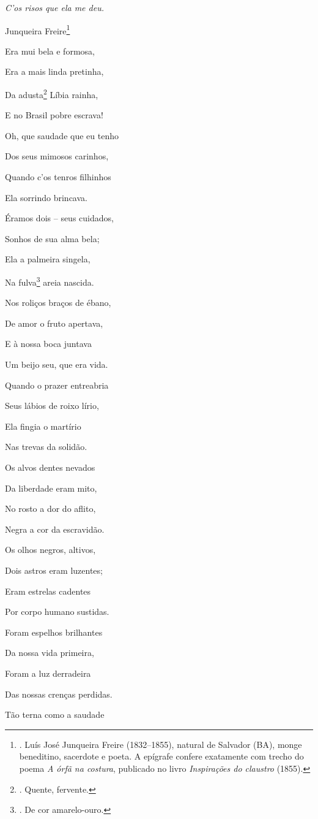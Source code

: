 \emph{C'os risos que ela me deu.}

Junqueira Freire\footnote{. Luís José Junqueira Freire (1832--1855),
  natural de Salvador (BA), monge beneditino, sacerdote e poeta. A
  epígrafe confere exatamente com trecho do poema \emph{A órfã na
  costura}, publicado no livro \emph{Inspirações do claustro} (1855).}

Era mui bela e formosa,

Era a mais linda pretinha,

Da adusta\footnote{. Quente, fervente.} Líbia rainha,

E no Brasil pobre escrava!

Oh, que saudade que eu tenho

Dos seus mimosos carinhos,

Quando c'os tenros filhinhos

Ela sorrindo brincava.

Éramos dois -- seus cuidados,

Sonhos de sua alma bela;

Ela a palmeira singela,

Na fulva\footnote{. De cor amarelo-ouro.} areia nascida.

Nos roliços braços de ébano,

De amor o fruto apertava,

E à nossa boca juntava

Um beijo seu, que era vida.

Quando o prazer entreabria

Seus lábios de roixo lírio,

Ela fingia o martírio

Nas trevas da solidão.

Os alvos dentes nevados

Da liberdade eram mito,

No rosto a dor do aflito,

Negra a cor da escravidão.

Os olhos negros, altivos,

Dois astros eram luzentes;

Eram estrelas cadentes

Por corpo humano sustidas.

Foram espelhos brilhantes

Da nossa vida primeira,

Foram a luz derradeira

Das nossas crenças perdidas.

Tão terna como a saudade

